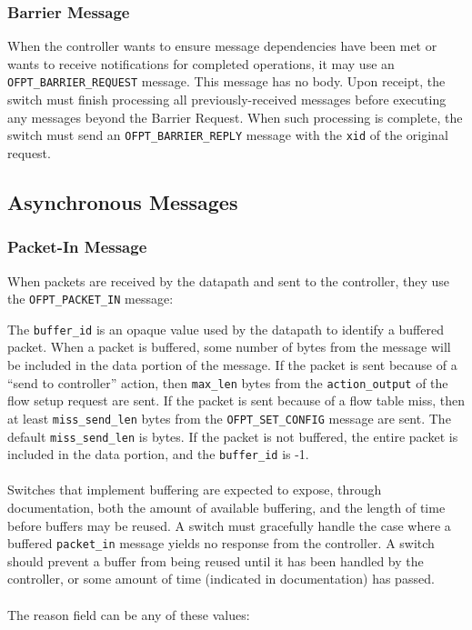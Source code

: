 \subsubsection{Barrier Message}
When the controller wants to ensure message dependencies have been met or wants to receive notifications for completed operations, it may use an \verb|OFPT_BARRIER_REQUEST| message.  This message has no body.  Upon receipt, the switch must finish processing all previously-received messages before executing any messages beyond the Barrier Request.  When such processing is complete, the switch must send an \verb|OFPT_BARRIER_REPLY| message with the \verb|xid| of the original request.

\subsection{Asynchronous Messages}
\subsubsection{Packet-In Message}
When packets are received by the datapath and sent to the controller, they use the \verb|OFPT_PACKET_IN| message:


The \verb|buffer_id| is an opaque value used by the datapath to identify a buffered packet.  When a packet is buffered, some number of bytes from the message will be included in the data portion of the message.  If the packet is sent because of a ``send to controller'' action, then \verb|max_len| bytes from the \verb|action_output| of the flow setup request are sent.  If the packet is sent because of a flow table miss, then at least \verb|miss_send_len| bytes from the \verb|OFPT_SET_CONFIG| message are sent.  The default \verb|miss_send_len| is bytes.  If the packet is not buffered, the entire packet is included in the data portion, and the \verb|buffer_id| is -1.  
\\\\
Switches that implement buffering are expected to expose, through documentation, both the amount of available buffering, and the length of time before buffers may be reused.  A switch must gracefully handle the case where a buffered \verb|packet_in| message yields no response from the controller.  A switch should prevent a buffer from being reused until it has been handled by the controller, or some amount of time (indicated in documentation) has passed.
\\\\
The reason field can be any of these values:

